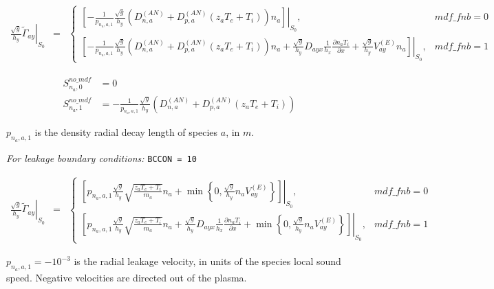 \documentclass[a4paper,10pt]{report}
\begin{document}
\begin{equation}
\begin{matrix}
\left. \frac{\sqrt g}{h_y} \widetilde{\Gamma}_{ay} \right|_{S_0}& =
& \left\{
\begin{matrix}
\left. \left[
	-\frac 1{p_{n_a,a,1}} \frac{\sqrt g}{h_y}  \left(
		D^{(AN)}_{n,a} + D^{(AN)}_{p,a} \left(z_a T_e + T_i \right)
	\right) n_a
\right] \right|_{S_0}, & mdf\_fnb = 0
\\
\left. \left[
	-\frac 1{p_{n_a,a,1}} \frac{\sqrt g}{h_y}  \left(
		D^{(AN)}_{n,a} + D^{(AN)}_{p,a} \left(z_a T_e + T_i \right)
	\right) n_a
	+
	\frac{\sqrt g}{h_y} D_{ayx} \frac1{h_x} \frac{\partial n_a T_i}{\partial x}
	+
	\frac{\sqrt g}{h_y} V_{ay}^{(E)} n_a
\right] \right|_{S_0}, & mdf\_fnb = 1
\end{matrix} \right.
\end{matrix}
\end{equation}

\begin{align}
S^{no\_mdf}_{n_a,0} & = 0 \\
S^{no\_mdf}_{n_a,1} & = - \frac{1}{p_{n_a,a,1}} \frac{\sqrt{g}}{h_y} \left( D^{(AN)}_{n,a} + D^{(AN)}_{p,a} \left( z_a T_e + T_i \right) \right)
\end{align}

$p_{n_a,a,1}$ is the density radial decay length of species $a$, in $m$.

{\em For leakage boundary conditions:} {\tt BCCON = 10}

\begin{equation}
\begin{matrix}
\left. \frac{\sqrt g}{h_y} \widetilde{\Gamma}_{ay} \right|_{S_0}& =
& \left\{
\begin{matrix}
\left. \left[
	p_{n_a,a,1} \frac{\sqrt g}{h_y} \sqrt{\frac{z_a T_e + T_i}{m_a}} n_a
	+
	\min \left\{0, \frac{\sqrt g}{h_y} n_a V_{ay}^{(E)} \right\}
\right] \right|_{S_0}, & mdf\_fnb = 0
\\
\left. \left[
p_{n_a,a,1} \frac{\sqrt g}{h_y} \sqrt{\frac{z_a T_e + T_i}{m_a}} n_a
	+
	\frac{\sqrt g}{h_y} D_{ayx} \frac1{h_x} \frac{\partial n_a T_i}{\partial x}
	+
	\min \left\{0, \frac{\sqrt g}{h_y} n_a V_{ay}^{(E)} \right\}
\right] \right|_{S_0}, & mdf\_fnb = 1
\end{matrix} \right.
\end{matrix}
\end{equation}

$p_{n_a,a,1} = -10^{-3}$ is the radial leakage velocity, in units of the species local sound speed. Negative velocities are directed out of the plasma.
\end{document}
